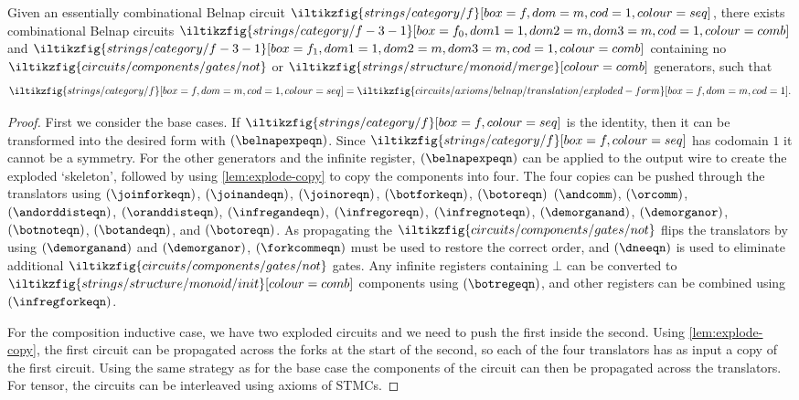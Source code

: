 \begin{proposition}\label{prop:exploded-belnap}
    Given an essentially combinational Belnap circuit \(
    \iltikzfig{strings/category/f}[box=f,dom=m,cod=1,colour=seq]
    \), there exists combinational Belnap circuits \(
    \iltikzfig{strings/category/f-3-1}[box=f_0,dom1=1,dom2=m,dom3=m,cod=1,colour=comb]
    \) and \(
    \iltikzfig{strings/category/f-3-1}[box=f_1,dom1=1,dom2=m,dom3=m,cod=1,colour=comb]
    \) containing no \(
    \iltikzfig{circuits/components/gates/not}
    \) or \(
    \iltikzfig{strings/structure/monoid/merge}[colour=comb]
    \) generators, such that \[
        \iltikzfig{strings/category/f}[box=f,dom=m,cod=1,colour=seq]
        =
        \iltikzfig{circuits/axioms/belnap/translation/exploded-form}[box=f,dom=m,cod=1].
    \]
\end{proposition}
\begin{proof}
    First we consider the base cases.
    If \(
    \iltikzfig{strings/category/f}[box=f,colour=seq]
    \) is the identity, then it can be transformed into the desired form
    with
    \((\belnapexpeqn)\).
    Since \(\iltikzfig{strings/category/f}[box=f,colour=seq]\) has codomain
    \(1\) it cannot be a symmetry.
    For the other generators and the infinite register,
    \((\belnapexpeqn)\) can be applied to the output wire to create the
    exploded `skeleton', followed by using \cref{lem:explode-copy} to copy the
    components into four.
    The four copies can be pushed through the translators
    using \((\joinforkeqn)\), \((\joinandeqn)\), \((\joinoreqn)\),
    \((\botforkeqn)\), \((\botoreqn)\) \((\andcomm)\), \((\orcomm)\),
    \((\andorddisteqn)\), \((\oranddisteqn)\), \((\infregandeqn)\),
    \((\infregoreqn)\), \((\infregnoteqn)\), \((\demorganand)\),
    \((\demorganor)\), \((\botnoteqn)\), \((\botandeqn)\), and \((\botoreqn)\).
    As propagating the \(
    \iltikzfig{circuits/components/gates/not}
    \) flips the translators by using \((\demorganand)\) and \((\demorganor)\),
    \((\forkcommeqn)\) must be used to restore the correct order, and
    \((\dneeqn)\) is used to eliminate additional
    \(\iltikzfig{circuits/components/gates/not}\) gates.
    Any infinite registers containing \(\bot\) can be converted to
    \(\iltikzfig{strings/structure/monoid/init}[colour=comb]\) components using
    \((\botregeqn)\), and other registers can be combined using
    \((\infregforkeqn)\).

    For the composition inductive case, we have two exploded circuits and we
    need to push the first inside the second.
    Using \cref{lem:explode-copy}, the first circuit can be propagated across
    the forks at the start of the second, so each of the four translators has as
    input a copy of the first circuit.
    Using the same strategy as for the base case the components of the circuit
    can then be propagated across the translators.
    For tensor, the circuits can be interleaved using axioms of STMCs.
\end{proof}

